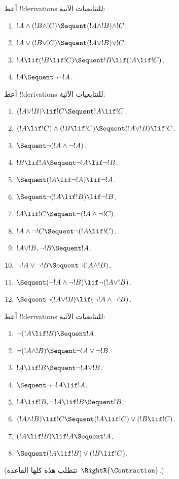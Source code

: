 \documentclass[../../../include/open-logic-section]{subfiles}
\begin{document}
\begin{prob}
أعط !!{derivation}s للتتابعيات الآتية:
\begin{enumerate}
\item $!A \land (!B \land !C) \Sequent (!A \land !B) \land !C$.
\item $!A \lor (!B \lor !C) \Sequent (!A \lor !B) \lor !C$.
\item $!A \lif (!B \lif !C) \Sequent !B \lif (!A \lif !C)$.
\item $!A \Sequent \lnot\lnot !A$.
\end{enumerate}
\end{prob}

\begin{prob}
أعط !!{derivation}s للتتابعيات الآتية:
\begin{enumerate}
\item $(!A \lor !B) \lif !C \Sequent !A \lif !C$.
\item $(!A \lif !C) \land (!B \lif !C) \Sequent (!A \lor !B) \lif !C$.
\item $\Sequent \lnot(!A \land \lnot !A)$.
\item $!B \lif !A \Sequent \lnot !A \lif \lnot !B$.
\item $\Sequent (!A \lif \lnot !A) \lif \lnot !A$.
\item $\Sequent \lnot(!A \lif !B) \lif \lnot !B$.
\item $!A \lif !C \Sequent \lnot (!A \land \lnot !C)$.
\item $!A \land \lnot !C \Sequent \lnot (!A \lif !C)$.
\item $!A \lor !B, \lnot !B \Sequent !A$.
\item $\lnot !A \lor \lnot !B \Sequent \lnot(!A \land !B)$.
\item $\Sequent (\lnot !A \land \lnot !B) \lif\lnot(!A \lor !B)$.
\item $\Sequent \lnot(!A \lor !B) \lif (\lnot !A \land \lnot !B)$.
\end{enumerate}
\end{prob}

\begin{prob}
أعط !!{derivation}s للتتابعيات الآتية:
\begin{enumerate}
\item $\lnot(!A \lif !B) \Sequent !A$.
\item $\lnot(!A \land !B) \Sequent \lnot !A \lor \lnot !B$.
\item $!A \lif !B \Sequent \lnot !A \lor !B$.
\item $\Sequent \lnot \lnot !A \lif !A$.
\item $!A \lif !B, \lnot !A \lif !B \Sequent !B$.
\item $(!A \land !B) \lif !C \Sequent (!A \lif !C) \lor (!B \lif !C)$.
\item $(!A \lif !B) \lif !A \Sequent !A$.
\item $\Sequent (!A \lif !B) \lor (!B \lif !C)$.
\end{enumerate}
(تتطلب هذه كلها القاعدة~$\RightR{\Contraction}$.)
\end{prob}
\end{document}
